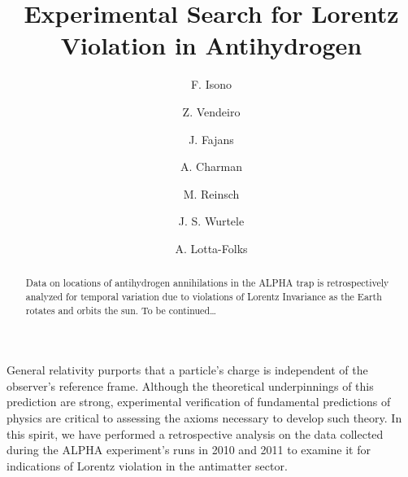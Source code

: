 \documentclass[superscriptaddress,aps,prb,11pt]{revtex4-1}
\begin{document}
\title{Experimental Search for Lorentz Violation in Antihydrogen}
\author{F. Isono}

\author{Z. Vendeiro}

\author{J. Fajans}

\author{A. Charman}

\author{M. Reinsch}

\author{J. S. Wurtele}

\author{A. Lotta-Folks}

\begin{abstract}
Data on locations of antihydrogen annihilations in the ALPHA trap is retrospectively analyzed for temporal variation due to violations of Lorentz Invariance as the Earth rotates and orbits the sun.  To be continued\ldots
\end{abstract}

\maketitle

General relativity purports that a particle's charge is independent of the observer's reference frame.  Although the theoretical underpinnings of this prediction are strong, experimental verification of fundamental predictions of physics are critical to assessing the axioms necessary to develop such theory.  In this spirit, we have performed a retrospective analysis on the data collected during the ALPHA experiment's runs in 2010 and 2011 to examine it for indications of Lorentz violation in the antimatter sector.
\end{document}

